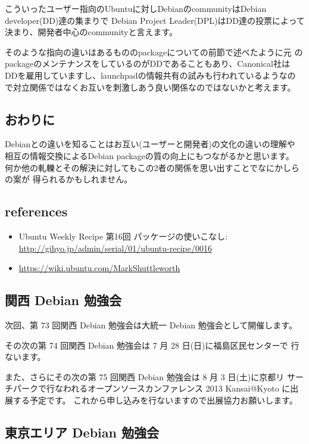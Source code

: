 \documentclass[mingoth,a4paper]{jsarticle}
\begin{document}
こういったユーザー指向のUbuntuに対しDebianのcommunityはDebian
developer(DD)達の集まりで Debian Project
Leader(DPL)はDD達の投票によって決まり、開発者中心のcommunityと言えます。

そのような指向の違いはあるもののpackageについての前節で述べたように元
のpackageのメンテナンスをしているのがDDであることもあり、Canonical社は
DDを雇用していますし、launchpadの情報共有の試みも行われているようなの
で対立関係ではなくお互いを刺激しあう良い関係なのではないかと考えます。

\subsection{おわりに}

Debianとの違いを知ることはお互い(ユーザーと開発者)の文化の違いの理解や
相互の情報交換によるDebian packageの質の向上にもつながるかと思います。
何か他の軋轢とその解決に対してもこの2者の関係を思い出すことでなにかしらの案が
得られるかもしれません。

\subsection{references}

\begin{itemize}
\itemsep1pt\parskip0pt
\item
  Ubuntu Weekly Recipe 第16回 パッケージの使いこなし:
  \url{http://gihyo.jp/admin/serial/01/ubuntu-recipe/0016}
\item
  \url{https://wiki.ubuntu.com/MarkShuttleworth}
\end{itemize}


\subsection{関西 Debian 勉強会}

次回、第 73 回関西 Debian 勉強会は大統一 Debian 勉強会として開催します。

その次の第 74 回関西 Debian 勉強会は 7 月 28 日(日)に福島区民センターで
行ないます。

また、さらにその次の第 75 回関西 Debian 勉強会は 8 月 3 日(土)に京都リ
サーチパークで行なわれるオープンソースカンファレンス 2013 Kansai@Kyoto
に出展する予定です。
これから申し込みを行ないますので出展協力お願いします。

\subsection{東京エリア Debian 勉強会}
\end{document}
